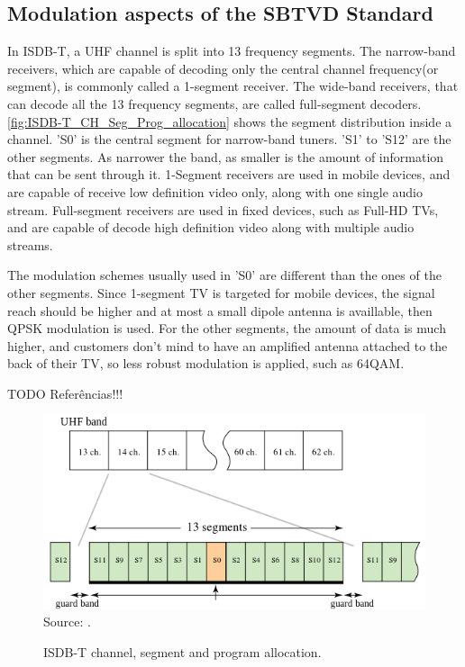 \documentclass[
	12pt,				%
	openright,			%
	twoside,			%
	a4paper,			%
	brazil,
	french,				%
	english
	]{abntex2}
\begin{document}
\begin{apendicesenv}

\partapendices

\chapter{Modulation aspects of the SBTVD Standard}
\label{modulation}
In ISDB-T, a UHF channel is split into 13 frequency segments. The narrow-band receivers, which are capable of decoding only the central channel frequency(or segment), is commonly called a 1-segment receiver. The wide-band receivers, that can decode all the 13 frequency segments, are called full-segment decoders. \autoref{fig:ISDB-T_CH_Seg_Prog_allocation} shows the segment distribution inside a channel. 'S0' is the central segment for narrow-band tuners. 'S1' to 'S12' are the other segments. As narrower the band, as smaller is the amount of information that can be sent through it. 1-Segment receivers are used in mobile devices, and are capable of receive low definition video only, along with one single audio stream. Full-segment receivers are used in fixed devices, such as Full-HD TVs, and are capable of decode high definition video along with multiple audio streams.

The modulation schemes usually used in 'S0' are different than the ones of the other segments. Since 1-segment TV is targeted for mobile devices, the signal reach should be higher and at most a small dipole antenna is availlable, then QPSK modulation is used. For the other segments, the amount of data is much higher, and customers don't mind to have an amplified antenna attached to the back of their TV, so less robust modulation is applied, such as 64QAM. 

TODO Referências!!!

\begin{figure}
\centering
\caption{ISDB-T channel, segment and program allocation.}
\includegraphics[width=0.8\linewidth]{figuras/ISDB-T_CH_Seg_Prog_allocation.png}
\\Source: .
\label{fig:ISDB-T_CH_Seg_Prog_allocation}
\end{figure}


\end{apendicesenv}
\end{document}
